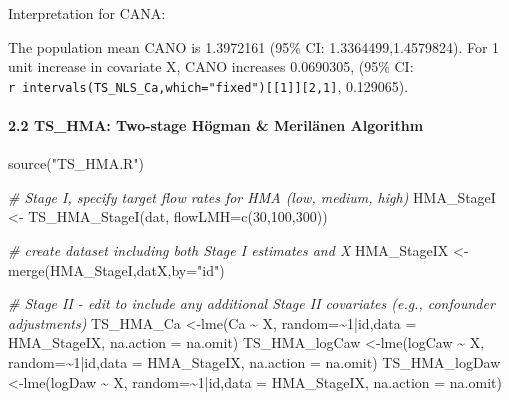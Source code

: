 \documentclass[
]{article}
\newenvironment{Shaded}{\begin{snugshade}}{\end{snugshade}}
\newcommand{\AttributeTok}[1]{\textcolor[rgb]{0.77,0.63,0.00}{#1}}
\newcommand{\CommentTok}[1]{\textcolor[rgb]{0.56,0.35,0.01}{\textit{#1}}}
\newcommand{\DecValTok}[1]{\textcolor[rgb]{0.00,0.00,0.81}{#1}}
\newcommand{\FunctionTok}[1]{\textcolor[rgb]{0.00,0.00,0.00}{#1}}
\newcommand{\NormalTok}[1]{#1}
\newcommand{\OtherTok}[1]{\textcolor[rgb]{0.56,0.35,0.01}{#1}}
\newcommand{\SpecialCharTok}[1]{\textcolor[rgb]{0.00,0.00,0.00}{#1}}
\newcommand{\StringTok}[1]{\textcolor[rgb]{0.31,0.60,0.02}{#1}}
\begin{document}
Interpretation for CANA:

The population mean CANO is 1.3972161 (95\% CI: 1.3364499,1.4579824).
For 1 unit increase in covariate X, CANO increases 0.0690305, (95\% CI:
\texttt{r\ intervals(TS\_NLS\_Ca,which="fixed"){[}{[}1{]}{]}{[}2,1{]}},
0.129065).

\hypertarget{ts_hma-two-stage-huxf6gman-meriluxe4nen-algorithm}{%
\paragraph{2.2 TS\_HMA: Two-stage Högman \& Merilänen
Algorithm}\label{ts_hma-two-stage-huxf6gman-meriluxe4nen-algorithm}}

\begin{Shaded}
\begin{Highlighting}[]
\FunctionTok{source}\NormalTok{(}\StringTok{"TS\_HMA.R"}\NormalTok{)}

\CommentTok{\# Stage I, specify target flow rates for  HMA (low, medium, high)}
\NormalTok{HMA\_StageI  }\OtherTok{\textless{}{-}} \FunctionTok{TS\_HMA\_StageI}\NormalTok{(dat, }\AttributeTok{flowLMH=}\FunctionTok{c}\NormalTok{(}\DecValTok{30}\NormalTok{,}\DecValTok{100}\NormalTok{,}\DecValTok{300}\NormalTok{))}

\CommentTok{\# create dataset including both Stage I estimates and X}
\NormalTok{HMA\_StageIX }\OtherTok{\textless{}{-}} \FunctionTok{merge}\NormalTok{(HMA\_StageI,datX,}\AttributeTok{by=}\StringTok{"id"}\NormalTok{)}

\CommentTok{\# Stage II {-}  edit to include any additional Stage II covariates (e.g., confounder adjustments)}
\NormalTok{TS\_HMA\_Ca      }\OtherTok{\textless{}{-}}\FunctionTok{lme}\NormalTok{(Ca }\SpecialCharTok{\textasciitilde{}}\NormalTok{ X,     }\AttributeTok{random=}\SpecialCharTok{\textasciitilde{}}\DecValTok{1}\SpecialCharTok{|}\NormalTok{id,}\AttributeTok{data =}\NormalTok{ HMA\_StageIX, }\AttributeTok{na.action =}\NormalTok{ na.omit)}
\NormalTok{TS\_HMA\_logCaw  }\OtherTok{\textless{}{-}}\FunctionTok{lme}\NormalTok{(logCaw }\SpecialCharTok{\textasciitilde{}}\NormalTok{ X, }\AttributeTok{random=}\SpecialCharTok{\textasciitilde{}}\DecValTok{1}\SpecialCharTok{|}\NormalTok{id,}\AttributeTok{data =}\NormalTok{ HMA\_StageIX, }\AttributeTok{na.action =}\NormalTok{ na.omit)}
\NormalTok{TS\_HMA\_logDaw  }\OtherTok{\textless{}{-}}\FunctionTok{lme}\NormalTok{(logDaw }\SpecialCharTok{\textasciitilde{}}\NormalTok{ X, }\AttributeTok{random=}\SpecialCharTok{\textasciitilde{}}\DecValTok{1}\SpecialCharTok{|}\NormalTok{id,}\AttributeTok{data =}\NormalTok{ HMA\_StageIX, }\AttributeTok{na.action =}\NormalTok{ na.omit)}
\end{Highlighting}
\end{Shaded}
\end{document}
